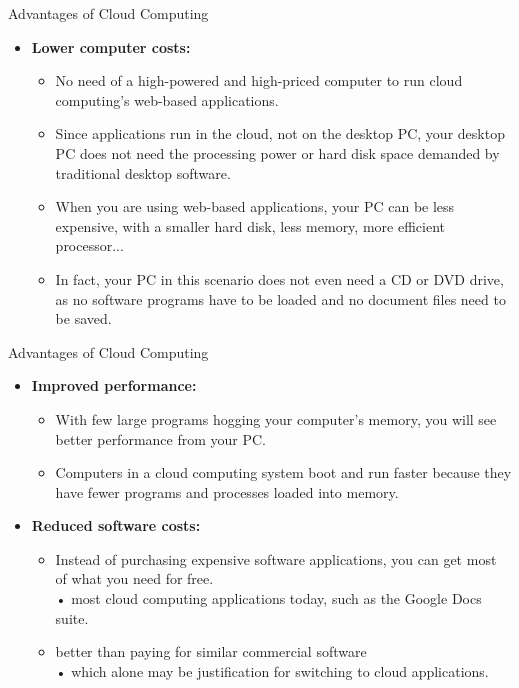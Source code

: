 \documentclass{SKP-beamer}
\begin{document}
\begin{frame}{Advantages of Cloud Computing}
	\begin{itemize}
		
		\item  \textbf{Lower computer costs:}
		\begin{itemize}
			\item  No need of a high-powered and high-priced computer to run cloud computing's 
			web-based applications.
			\item  Since applications run in the cloud, not on the desktop PC, your desktop PC does not 
			need the processing power or hard disk space demanded by traditional desktop 
			software.
			\item  When you are using web-based applications, your PC can be less expensive, with a
			smaller hard disk, less memory, more efficient processor...
			\item  In fact, your PC in this scenario does not even need a CD or DVD drive, as no 
			software programs have to be loaded and no document files need to be saved.
			
		\end{itemize}
		
	\end{itemize}
\end{frame}
\begin{frame}{Advantages of Cloud Computing}
	\begin{itemize}
		
		\item  \textbf{Improved performance:}
		\begin{itemize}
			\item  With few large programs hogging your computer's memory, you will see better 
			performance from your PC.
			\item  Computers in a cloud computing system boot and run faster because they have 
			fewer programs and processes loaded into memory.
			
		\end{itemize}
			\item  \textbf{Reduced software costs:}
		\begin{itemize}
			\item  Instead of purchasing expensive software applications, you can get most of what 
			you need for free. \\
			• most cloud computing applications today, such as the Google Docs suite.
			\item  better than paying for similar commercial software \\
			• which alone may be justification for switching to cloud applications.
			
			
		\end{itemize}
	\end{itemize}
\end{frame}
\end{document}
